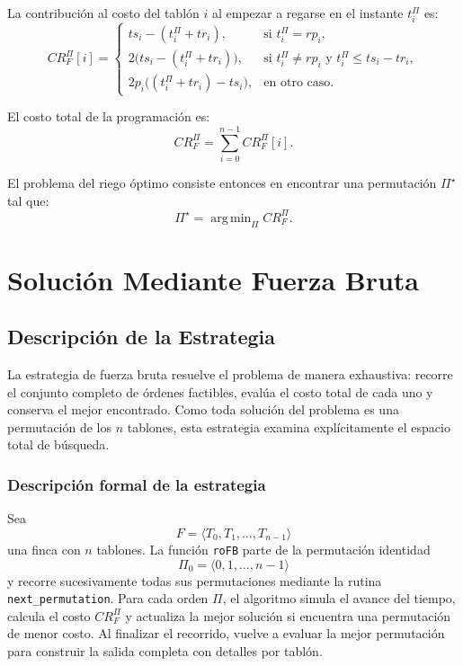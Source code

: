 \documentclass[12pt,a4paper]{article}
\DeclareMathOperator*{\argmin}{arg\,min}
\begin{document}
La contribuci\'on al costo del tabl\'on \(i\) al empezar a regarse en el instante \(t_i^\Pi\) es:
\[
CR_F^\Pi[i] =
\begin{cases}
ts_i - (t_i^\Pi + tr_i), & \text{si } t_i^\Pi = rp_i, \\[4pt]
2\bigl(ts_i - (t_i^\Pi + tr_i)\bigr), & \text{si } t_i^\Pi \neq rp_i \text{ y } t_i^\Pi \leq ts_i - tr_i, \\[4pt]
2p_i\bigl((t_i^\Pi + tr_i) - ts_i\bigr), & \text{en otro caso.}
\end{cases}
\]

El costo total de la programaci\'on es:
\[
CR_F^\Pi = \sum_{i=0}^{n-1} CR_F^\Pi[i].
\]

El problema del riego \'optimo consiste entonces en encontrar una permutaci\'on \(\Pi^\star\) tal que:
\[
\Pi^\star = \argmin_{\Pi} CR_F^\Pi.
\]

\section{Soluci\'on Mediante Fuerza Bruta}

\subsection{Descripci\'on de la Estrategia}

La estrategia de fuerza bruta resuelve el problema de manera exhaustiva: recorre el conjunto completo de \'ordenes factibles, eval\'ua el costo total de cada uno y conserva el mejor encontrado. Como toda soluci\'on del problema es una permutaci\'on de los \(n\) tablones, esta estrategia examina expl\'icitamente el espacio total de b\'usqueda.

\subsubsection{Descripci\'on formal de la estrategia}

Sea
\[
F=\langle T_0,T_1,\dots,T_{n-1}\rangle
\]
una finca con \(n\) tablones. La funci\'on \texttt{roFB} parte de la permutaci\'on identidad
\[
\Pi_0=\langle 0,1,\dots,n-1\rangle
\]
y recorre sucesivamente todas sus permutaciones mediante la rutina \texttt{next\_permutation}. Para cada orden \(\Pi\), el algoritmo simula el avance del tiempo, calcula el costo \(CR_F^\Pi\) y actualiza la mejor soluci\'on si encuentra una permutaci\'on de menor costo. Al finalizar el recorrido, vuelve a evaluar la mejor permutaci\'on para construir la salida completa con detalles por tabl\'on.
\end{document}
